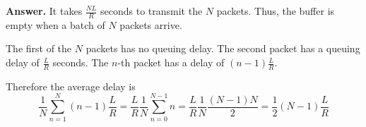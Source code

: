 
\textbf{Answer.}  It takes \(\frac{NL}{R}\) seconds to transmit the
\(N\) packets. Thus, the buffer is empty when a batch of \(N\) packets
arrive.

The first of the \(N\) packets has no queuing delay. The second packet
has a queuing delay of \(\frac{L}{R}\) seconds. The \(n\)-th packet
has a delay of \((n-1){\frac{L}{R}}\).

Therefore the average delay is \setlength\mathindent{-1pc}
\[
 {\frac{1}{N}}\sum_{n=1}^{N}(n-1){\frac{L}{R}} = \frac{L}{R}
 \frac{1}{N} \sum_{n=0}^{N-1}n = \frac{L}{R} \frac{1}{N}
 \frac{(N-1)N}{2} = \frac{1}{2} (N-1) \frac{L}{R} 
\]
